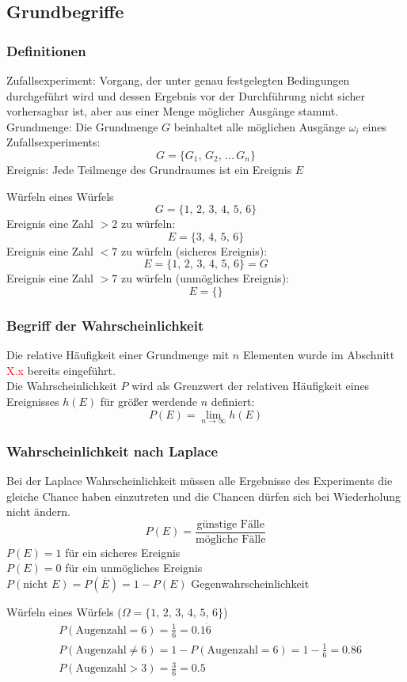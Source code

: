 \subsection{Grundbegriffe}
\subsubsection{Definitionen}
Zufallsexperiment: Vorgang, der unter genau festgelegten Bedingungen durchgeführt wird und dessen Ergebnis vor der Durchführung nicht sicher vorhersagbar ist, aber aus einer Menge möglicher Ausgänge stammt. \\
Grundmenge: Die Grundmenge $G$ beinhaltet alle möglichen Ausgänge $\omega_i$ eines Zufallsexperiments:
\[
    G = \{ G_1,\,G_2,\,\dots\,G_n\}
\]
Ereignis: Jede Teilmenge des Grundraumes ist ein Ereignis $E$
\begin{bsp}
    Würfeln eines Würfels
    \[
        G = \{1,\, 2,\, 3,\, 4,\, 5,\, 6\}
    \]
    Ereignis eine Zahl $>2$ zu würfeln:
    \[
        E=\{3,\, 4,\, 5,\, 6\}
    \]
    Ereignis eine Zahl $<7$ zu würfeln (sicheres Ereignis):
    \[
        E=\{1,\, 2,\, 3,\, 4,\, 5,\, 6\} = G
    \]
    Ereignis eine Zahl $>7$ zu würfeln (unmögliches Ereignis):
    \[
        E=\{\}
    \]
\end{bsp}
\subsubsection{Begriff der Wahrscheinlichkeit}
Die relative Häufigkeit einer Grundmenge mit $n$ Elementen wurde im Abschnitt \textcolor{red}{X.x} bereits eingeführt.\\
Die Wahrscheinlichkeit $P$ wird als Grenzwert der relativen Häufigkeit eines Ereignisses $h(E)$ für größer werdende $n$ definiert:
\[
    P(E) = \lim_{n\rightarrow\infty}{h(E)}
\]
\subsubsection{Wahrscheinlichkeit nach Laplace}
Bei der Laplace Wahrscheinlichkeit müssen alle Ergebnisse des Experiments die gleiche Chance haben einzutreten und die Chancen dürfen sich bei Wiederholung nicht ändern.
\[
    P(E) = \frac{\text{günstige Fälle}}{\text{mögliche Fälle}}
\]
$P(E)=1$ für ein sicheres Ereignis \\
$P(E)=0$ für ein unmögliches Ereignis \\
$P(\text{nicht } E) = P(\overline{E}) = 1 - P(E)$ Gegenwahrscheinlichkeit
\begin{bsp}
    Würfeln eines Würfels (\(\Omega = \{1,\, 2,\, 3,\, 4,\, 5,\, 6\}\))
    \begin{align*}
        &P(\mathrm{Augenzahl = 6}) = \frac{1}{6} = 0.1\dot{6} \\
        &P(\mathrm{Augenzahl \neq 6}) = 1 -  P(\mathrm{Augenzahl = 6}) = 1 - \frac{1}{6} = 0.8\dot{6} \\
        &P(\mathrm{Augenzahl > 3}) = \frac{3}{6} = 0.5
    \end{align*}
\end{bsp}

